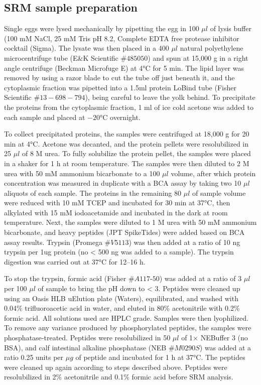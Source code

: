 \subsection{SRM sample preparation}

Single eggs were lysed mechanically by pipetting the egg in 100 $\mu l$ of lysis buffer (100 mM NaCl, 25 mM Tris pH 8.2, Complete EDTA free protease inhibitor cocktail (Sigma). The lysate was then placed in a 400 $\mu l$ natural polyethylene microcentrifuge tube (E\&K Scientific $\#485050$) and spun at 15,000 g in a right angle centrifuge (Beckman Microfuge E) at 4\si{\degree}C for 5 min. The lipid layer was removed by using a razor blade to cut the tube off just beneath it, and the cytoplasmic fraction was pipetted into a 1.5ml protein LoBind tube (Fisher Scientific $\#13-698-794$), being careful to leave the yolk behind. To precipitate the proteins from the cytoplasmic fraction, 1 ml of ice cold acetone was added to each sample and placed at $−20$\si{\degree}C overnight.

To collect precipitated proteins, the samples were centrifuged at 18,000 g for 20 min at 4\si{\degree}C. Acetone was decanted, and the protein pellets were resolubilized in 25 $\mu l$ of 8 M urea. To fully solubilize the protein pellet, the samples were placed in a shaker for 1 h at room temperature. The samples were then diluted to 2 M urea with 50 mM ammonium bicarbonate to a 100 $\mu l$ volume, after which protein concentration was measured in duplicate with a BCA assay by taking two 10 $\mu l$ aliquots of each sample. The proteins in the remaining 80 $\mu l$ of sample volume were reduced with 10 mM TCEP and incubated for 30 min at 37\si{\degree}C, then alkylated with 15 mM iodoacetamide and incubated in the dark at room temperature. Next, the samples were diluted to 1 M urea with 50 mM ammonium bicarbonate, and heavy peptides (JPT SpikeTides) were added based on BCA assay results. Trypsin (Promega $\#V5113$) was then added at a ratio of 10 ng trypsin per 1ug protein (no < 500 ng was added to a sample). The trypsin digestion was carried out at 37\si{\degree}C for 12–16 h.

To stop the trypsin, formic acid (Fisher $\#A117‐50$) was added at a ratio of 3 $\mu l$ per 100 $\mu l$ of sample to bring the pH down to < 3. Peptides were cleaned up using an Oasis HLB uElution plate (Waters), equilibrated, and washed with 0.04\% trifluoroacetic acid in water, and eluted in 80\% acetonitrile with 0.2\% formic acid. All solutions used are HPLC grade. Samples were then lyophilized. To remove any variance produced by phosphorylated peptides, the samples were phosphatase‐treated. Peptides were resolubilized in 50 $\mu l$ of 1× NEBuffer 3 (no BSA), and calf intestinal alkaline phosphatase (NEB $\#M0290S$) was added at a ratio 0.25 units per $\mu g$ of peptide and incubated for 1 h at 37\si{\degree}C. The peptides were cleaned up again according to steps described above. Peptides were resolubilized in 2\% acetonitrile and 0.1\% formic acid before SRM analysis.

